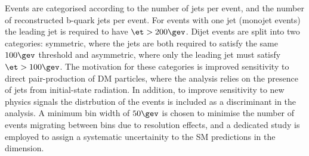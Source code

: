 
Events are categorised according to the number of jets per event,
and the number of reconstructed b-quark jets
per event. For events with one jet (monojet events) the leading jet is required to have $\et > 200\gev$. Dijet events are split into two categories: symmetric, where the jets are both required to satisfy the same $100\gev$ \et threshold and asymmetric, where only the leading jet must satisfy $\et > 100\gev$. The motivation for these categories is improved sensitivity to direct pair-production of DM particles, where the analysis relies on the presence of jets from initial-state radiation. In addition, to improve sensitivity to new physics signals the \mht distrbution of the events is included as a discriminant in the analysis. A minimum bin width of $50\gev$ is chosen to minimise the number of events migrating between bins due to resolution effects, and a dedicated study is employed to assign a systematic uncertainity to the SM predictions in the \mht dimension.


